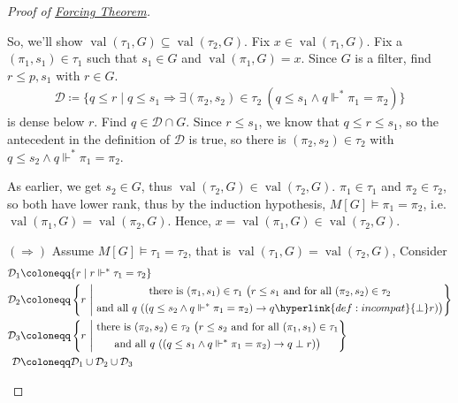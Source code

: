 \documentclass{article}
\newcommand{\1}{\mathbbm{1}}
\DeclareMathOperator{\val}{val}
\let\models\vDash
\let\forces\Vdash
\begin{document}
\begin{proof}[Proof of \hyperlink{thm:forcing}{Forcing Theorem}]
\begin{enumerate}
      So, we'll show $\val(\tau_1,G) \subseteq \val(\tau_2,G)$.
      Fix $x \in \val(\tau_1,G)$.
      Fix a $(\pi_1,s_1) \in \tau_1$ such that $s_1 \in G$ and $\val(\pi_1,G) = x$.
      Since $G$ is a filter, find $r \leq p,s_1$ with $r \in G$.
      \begin{align*}
        \mathcal{D} \coloneqq \{ q \leq r \mid q \leq s_1 \Rightarrow \exists(\pi_2, s_2) \in \tau_2 \ (q \leq s_1 \land q \forces^* \pi_1=\pi_2)\}
      \end{align*}
      is dense below $r$.
      Find $q \in \mathcal{D} \cap G$. Since $r \leq s_1$, we know that $q \leq r \leq s_1$, so the antecedent in the definition of $\mathcal{D}$ is true, so there is $(\pi_2,s_2) \in \tau_2$ with $q \leq s_2 \land q \forces^* \pi_1 = \pi_2$.

      As earlier, we get $s_2 \in G$, thus $\val(\tau_2,G) \in \val(\tau_2,G)$. $\pi_1 \in \tau_1$ and $\pi_2 \in \tau_2$, so both have lower rank, thus by the induction hypothesis, $M[G] \models \pi_1 = \pi_2$, i.e.\ $\val(\pi_1,G) = \val(\pi_2,G)$.
      Hence, $x=\val(\pi_1,G) \in \val(\tau_2,G)$.

      $(\Rightarrow)$ Assume $M[G] \models \tau_1 = \tau_2$, that is $\val(\tau_1,G) = \val(\tau_2,G)$,
      Consider
      \begin{align*}
        \mathcal{D}_1 &\coloneqq \{r \mid r \forces^* \tau_1 = \tau_2\}\\
        \mathcal{D}_2 &\coloneqq \left\{r\ \middle\vert\
          \begin{gathered}
            \text{there is } (\pi_1,s_1) \in \tau_1 \ \big(r \leq s_1 \text{ and for all }(\pi_2,s_2) \in \tau_2\\ \text{and all } q \ ((q \leq s_2 \land q \forces^* \pi_1 = \pi_2) \rightarrow q \hyperlink{def:incompat}{\perp} r)\big)
          \end{gathered}
        \right\}\\
        \mathcal{D}_3 &\coloneqq \left\{r\ \middle\vert\
            \begin{gathered}
              \text{there is } (\pi_2,s_2) \in \tau_2 \ \big(r \leq s_2 \text{ and for all }(\pi_1,s_1) \in \tau_1\\ \text{and all } q \ ((q \leq s_1 \land q \forces^* \pi_1 = \pi_2) \rightarrow q \perp r)\big)
            \end{gathered}
          \right\}\\
        \mathcal{D} &\coloneqq \mathcal{D}_1 \cup \mathcal{D}_2 \cup \mathcal{D}_3
      \end{align*}


\end{enumerate}
\end{proof}
\end{document}
